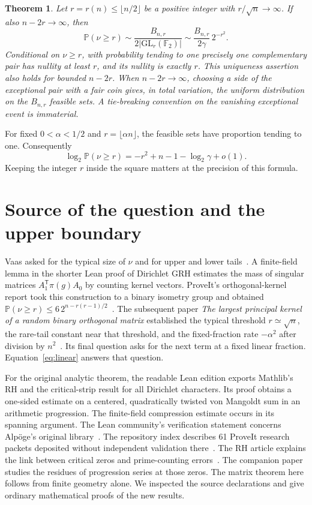 \documentclass[11pt,letterpaper]{article}
\newtheorem{theorem}{Theorem}
\newcommand{\F}{\mathbb F_2}\newcommand{\E}{\mathbb E}\newcommand{\PP}{\mathbb P}
\newcommand{\GL}{\mathrm{GL}}\newcommand{\nul}{\operatorname{null}}
\begin{document}
\begin{theorem}\label{thm:main}
Let $r=r(n)\le\lfloor n/2\rfloor$ be a positive integer with $r/\sqrt n\to\infty$.
If also $n-2r\to\infty$, then
\begin{equation}\label{eq:main}
 \PP(\nu\ge r)\sim\frac{B_{n,r}}{2|\GL_r(\F)|}
             \sim\frac{B_{n,r}}{2\gamma}\,2^{-r^2}.
\end{equation}
Conditional on $\nu\ge r$, with probability tending to one precisely one complementary pair has nullity at least $r$, and its nullity is exactly $r$. This uniqueness assertion also holds for bounded $n-2r$. When $n-2r\to\infty$, choosing a side of the exceptional pair with a fair coin gives, in total variation, the uniform distribution on the $B_{n,r}$ feasible sets. A tie-breaking convention on the vanishing exceptional event is immaterial.
\end{theorem}
For fixed $0<\alpha<1/2$ and $r=\lfloor\alpha n\rfloor$, the feasible sets have proportion tending to one. Consequently
\begin{equation}\label{eq:linear}
 \log_2\PP(\nu\ge r)=-r^2+n-1-\log_2\gamma+o(1).
\end{equation}
Keeping the integer $r$ inside the square matters at the precision of this formula.

\section{Source of the question and the upper boundary}
Vaas asked for the typical size of $\nu$ and for upper and lower tails~\cite{vaas}. A finite-field lemma in the shorter Lean proof of Dirichlet GRH estimates the mass of singular matrices $A_1^{\mathsf T}\pi(g)A_0$ by counting kernel vectors. ProveIt's orthogonal-kernel report took this construction to a binary isometry group and obtained $\PP(\nu\ge r)\le6\,2^{n-r(r-1)/2}$~\cite{up,prior}. The subsequent paper \emph{The largest principal kernel of a random binary orthogonal matrix} established the typical threshold $r\simeq\sqrt n$, the rare-tail constant near that threshold, and the fixed-fraction rate $-\alpha^2$ after division by $n^2$~\cite{previous}. Its final question asks for the next term at a fixed linear fraction. Equation~\eqref{eq:linear} answers that question.

For the original analytic theorem, the readable Lean edition exports Mathlib's RH and the critical-strip result for all Dirichlet characters. Its proof obtains a one-sided estimate on a centered, quadratically twisted von Mangoldt sum in an arithmetic progression. The finite-field compression estimate occurs in its spanning argument. The Lean community's verification statement concerns Alp\"oge's original library~\cite{verification}. The repository index describes 61 ProveIt research packets deposited without independent validation there~\cite{prior}. The RH article explains the link between critical zeros and prime-counting errors~\cite{wiki}. The companion paper studies the residues of progression series at those zeros. The matrix theorem here follows from finite geometry alone. We inspected the source declarations and give ordinary mathematical proofs of the new results.
\end{document}
